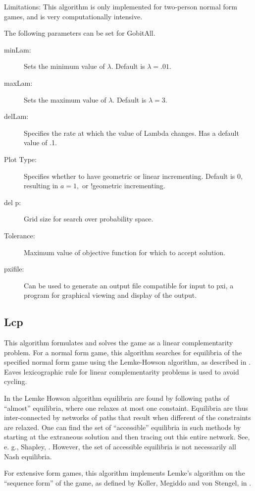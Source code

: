Limitations:  This algorithm is only implemented for two-person normal
form games, and is very computationally intensive.

The following parameters can be set for GobitAll.

\begin{description}
\item[minLam:] Sets the minimum value of $\lambda.$
Default is $\lambda = .01.$
\item[maxLam:]  Sets the maximum value of $\lambda.$
Default is $\lambda = 3.$ 
\item[delLam:] Specifies the rate at which the value of Lambda changes.
Has a default value of .1.
\item[Plot Type:] Specifies whether to have geometric or linear incrementing.
Default is 0, resulting in $a = 1,$ or !geometric incrementing.
\item[del p:] Grid size for search over probability space.  
\item[Tolerance:] Maximum value of objective function for which to accept solution.  
\item[pxifile:] Can be used to generate an output file compatible for
input to pxi, a program for graphical viewing and display of the output.
\end{description}

\subsection{Lcp}\label{Lcp}
This algorithm formulates and solves the game as a linear complementarity problem.  
For a normal form game, this algorithm searches for equilibria of the
specified normal form game using the Lemke-Howson algorithm, as described
in \cite{LemHow:64}. Eaves \cite{Eav:71} lexicographic rule for
linear complementarity problems is used to avoid cycling.

In the Lemke Howson algorithm equilibria are found by following paths of
``almost'' equilibria, where one relaxes at most one constaint.
Equilibria are thus inter-connected by networks of paths that result when
different of the constraints are relaxed.  One can find the set of
``accessible''  equilibria in such methods by starting at the extraneous
solution and then tracing out this entire network.  See, e. g., Shapley,
\cite{Sha:74}.  However, the set of accessible equilibria is not necessarily all
Nash equilibria.

For extensive form games, this algorithm implements Lemke's algorithm on
the ``sequence form'' of the game, as defined by Koller, Megiddo and von Stengel, in  \cite{KolMegSte:94}.

